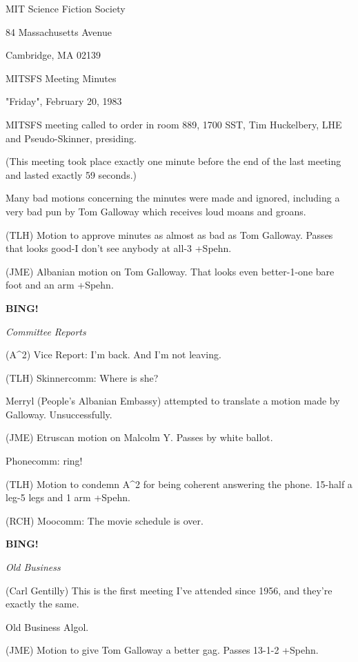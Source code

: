 \documentclass[12pt]{article}
\newcommand{\bing}{{\bf BING!} }
\newcommand{\goto}[1]{\bing \vskip 12pt \centerline{{\em{#1}}}}
\begin{document}
\begin{center}

MIT Science Fiction Society 

84 Massachusetts Avenue

Cambridge, MA 02139

\vspace{12pt}

MITSFS Meeting Minutes 

"Friday", February 20, 1983

\end{center}
 
\vspace{18pt}

\setlength{\parskip}{6pt}

\noindent
MITSFS meeting called to order in room 889, 1700 SST,
Tim Huckelbery, LHE and Pseudo-Skinner, presiding.

(This meeting took place exactly one minute before the end of the last meeting and lasted exactly 59 seconds.)

Many bad motions concerning the minutes were made and ignored, including a very bad pun by Tom Galloway which receives loud moans and groans.

(TLH) Motion to approve minutes as almost as bad as Tom Galloway. Passes that looks good-I don't see anybody at all-3 +Spehn.

(JME) Albanian motion on Tom Galloway. That looks even better-1-one bare foot and an arm +Spehn.

\goto{Committee Reports}

(A^2) Vice Report: I'm back. And I'm not leaving.

(TLH) Skinnercomm: Where is she?

Merryl (People's Albanian Embassy) attempted to translate a motion made by Galloway. Unsuccessfully.

(JME) Etruscan motion on Malcolm Y. Passes by white ballot.

Phonecomm: ring!

(TLH) Motion to condemn A^2 for being coherent answering the phone. 15-half a leg-5 legs and 1 arm +Spehn.

(RCH) Moocomm: The movie schedule is over.

\goto{Old Business}

(Carl Gentilly) This is the first meeting I've attended since 1956, and they're exactly the same.

Old Business Algol.

(JME) Motion to give Tom Galloway a better gag. Passes 13-1-2 +Spehn.
\end{document}
